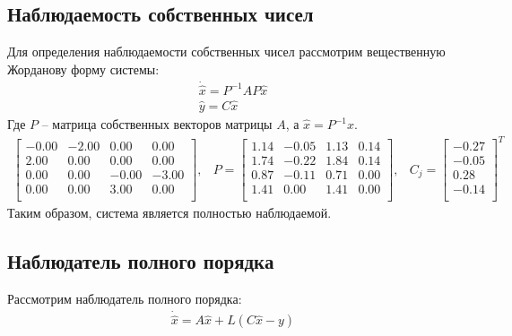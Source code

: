 \subsection{Наблюдаемость собственных чисел}
Для определения наблюдаемости собственных чисел рассмотрим вещественную Жорданову форму системы:
\begin{equation}
    \begin{array}{ll}
        \dot{\hat{x}} = P^{-1}AP\hat{x}\\
        \hat{y} = C\hat{x}
    \end{array}
\end{equation}
Где $P$ -- матрица собственных векторов матрицы $A$, а $\hat{x} = P^{-1}x$.
\begin{equation}
    \begin{array}{ccc}
        \begin{bmatrix}
            -0.00  & -2.00  & 0.00  & 0.00 \\ 
            2.00  & 0.00  & 0.00  & 0.00 \\ 
            0.00  & 0.00  & -0.00  & -3.00 \\ 
            0.00  & 0.00  & 3.00  & 0.00 \\ 
        \end{bmatrix}, &
        P = \begin{bmatrix}
            1.14  & -0.05  & 1.13  & 0.14 \\ 
            1.74  & -0.22  & 1.84  & 0.14 \\ 
            0.87  & -0.11  & 0.71  & 0.00 \\ 
            1.41  & 0.00  & 1.41  & 0.00 \\ 
        \end{bmatrix}, & 
        C_j =\begin{bmatrix}
            -0.27 \\ -0.05  \\ 0.28  \\ -0.14 \\ 
        \end{bmatrix}^T
    \end{array}
\end{equation}
Таким образом, система является полностью наблюдаемой. 

\subsection{Наблюдатель полного порядка}
Рассмотрим наблюдатель полного порядка:
\begin{equation}
    \begin{array}{ll}
        \dot{\hat{x}} = A\hat{x} + L(C\hat{x} - y)\\
    \end{array}
\end{equation}

